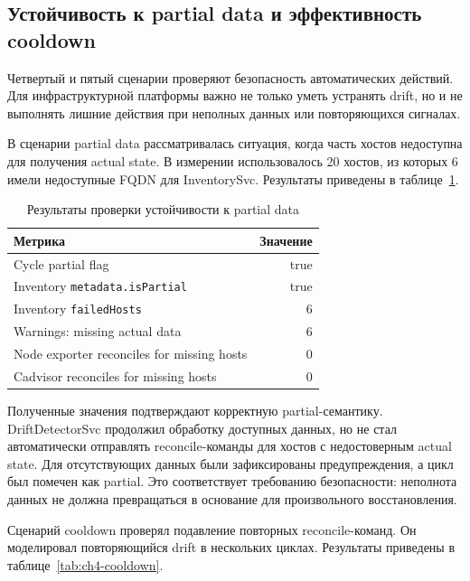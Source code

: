 \subsection{Устойчивость к partial data и эффективность cooldown}

Четвертый и пятый сценарии проверяют безопасность автоматических действий. Для инфраструктурной платформы важно не только уметь устранять drift, но и не выполнять лишние действия при неполных данных или повторяющихся сигналах.

В сценарии partial data рассматривалась ситуация, когда часть хостов недоступна для получения actual state. В измерении использовалось 20 хостов, из которых 6 имели недоступные FQDN для InventorySvc. Результаты приведены в таблице~\ref{tab:ch4-partial-data}.

\begin{table}
    \centering
    \caption{Результаты проверки устойчивости к partial data}
    \label{tab:ch4-partial-data}
    \footnotesize
    \begin{tabularx}{0.85\textwidth}{|X|r|}\hline
    Метрика & Значение \\ \hline
    Cycle partial flag & true \\ \hline
    Inventory \texttt{metadata.isPartial} & true \\ \hline
    Inventory \texttt{failedHosts} & 6 \\ \hline
    Warnings: missing actual data & 6 \\ \hline
    Node exporter reconciles for missing hosts & 0 \\ \hline
    Cadvisor reconciles for missing hosts & 0 \\ \hline
    \end{tabularx}
    \normalsize
\end{table}

Полученные значения подтверждают корректную partial-семантику. DriftDetectorSvc продолжил обработку доступных данных, но не стал автоматически отправлять reconcile-команды для хостов с недостоверным actual state. Для отсутствующих данных были зафиксированы предупреждения, а цикл был помечен как partial. Это соответствует требованию безопасности: неполнота данных не должна превращаться в основание для произвольного восстановления.

Сценарий cooldown проверял подавление повторных reconcile-команд. Он моделировал повторяющийся drift в нескольких циклах. Результаты приведены в таблице~\ref{tab:ch4-cooldown}.

